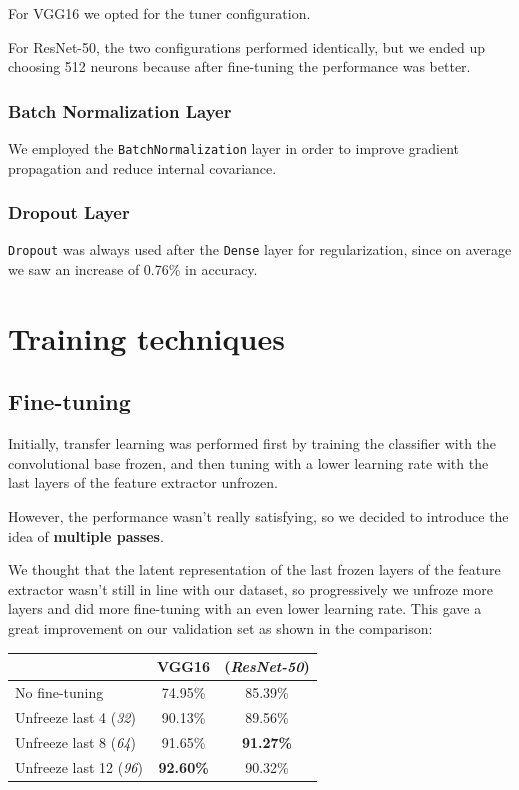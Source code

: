 \documentclass[conference,compsoc,11pt]{IEEEtran}
\begin{document}
For VGG16 we opted for the tuner configuration.

For ResNet-50, the two configurations performed identically, but we ended up choosing 512 neurons because after fine-tuning the performance was better.

\subsubsection{Batch Normalization Layer}

We employed the \verb|BatchNormalization| layer in order to improve gradient propagation and reduce internal covariance.

\subsubsection{Dropout Layer}

\verb|Dropout| was always used after the \verb|Dense| layer for regularization, since on average we saw an increase of 0.76\% in accuracy.

\section{Training techniques}

\subsection{Fine-tuning}\label{sec:tuning}
Initially, transfer learning was performed first by training the classifier with the convolutional base frozen, and then tuning with a lower learning rate with the last layers of the feature extractor unfrozen.

However, the performance wasn't really satisfying, so we decided to introduce the idea of \textbf{multiple passes}.

We thought that the latent representation of the last frozen layers of the feature extractor wasn't still in line with our dataset, so progressively we unfroze more layers and did more fine-tuning with an even lower learning rate.
This gave a great improvement on our validation set as shown in the comparison:

\begin{center}
\begin{tabular}{lcc}
\hline\hline
& VGG16 & (\textit{ResNet-50}) \\
\hline
No fine-tuning & 74.95\% & 85.39\% \\
Unfreeze last 4 (\emph{32}) & 90.13\% & 89.56\% \\
Unfreeze last 8 (\textit{64}) & 91.65\% & \textbf{91.27\%} \\
Unfreeze last 12 (\textit{96}) & \textbf{92.60\%} & 90.32\% \\
\hline\hline
\end{tabular}
\end{center}
\end{document}

